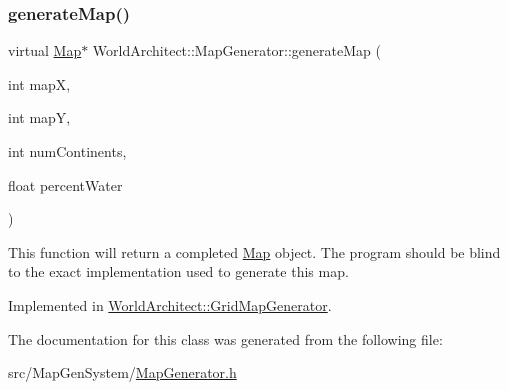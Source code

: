 \subsubsection{\texorpdfstring{generateMap()}{generateMap()}}
{\footnotesize\ttfamily virtual \mbox{\hyperlink{class_world_architect_1_1_map}{Map}}$\ast$ World\+Architect\+::\+Map\+Generator\+::generate\+Map (\begin{DoxyParamCaption}\item[{int}]{mapX,  }\item[{int}]{mapY,  }\item[{int}]{num\+Continents,  }\item[{float}]{percent\+Water }\end{DoxyParamCaption})\hspace{0.3cm}{\ttfamily [pure virtual]}}

This function will return a completed \mbox{\hyperlink{class_world_architect_1_1_map}{Map}} object. The program should be blind to the exact implementation used to generate this map. 

Implemented in \mbox{\hyperlink{class_world_architect_1_1_grid_map_generator_a7155387434e6d740c487eeade985f78d}{World\+Architect\+::\+Grid\+Map\+Generator}}.



The documentation for this class was generated from the following file\+:\begin{DoxyCompactItemize}
\item 
src/\+Map\+Gen\+System/\mbox{\hyperlink{_map_generator_8h}{Map\+Generator.\+h}}\end{DoxyCompactItemize}
